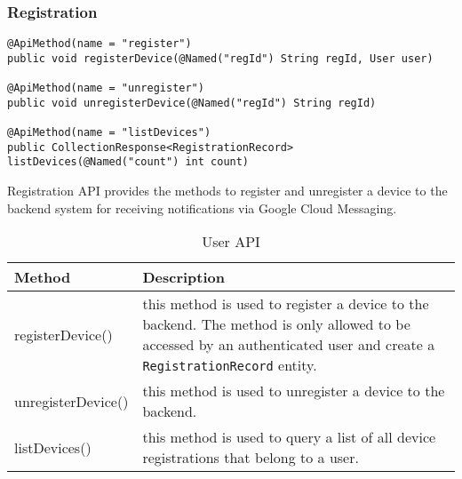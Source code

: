 \subsubsection{Registration}
\begin{minipage}{\linewidth}
\begin{lstlisting}
@ApiMethod(name = "register")
public void registerDevice(@Named("regId") String regId, User user)

@ApiMethod(name = "unregister")
public void unregisterDevice(@Named("regId") String regId)

@ApiMethod(name = "listDevices")
public CollectionResponse<RegistrationRecord> listDevices(@Named("count") int count)
\end{lstlisting}
\end{minipage}

Registration API provides the methods to register and unregister a device to the backend system for receiving
notifications via Google Cloud Messaging.

\begin{table}[h]
\begin{center}
    \begin{tabular}{| l | p{12cm} |}
        \hline Method & Description \\
        \hline registerDevice() & 
            this method is used to register a device to the backend. The method is only allowed to be accessed by an
            authenticated user and create a \texttt{RegistrationRecord} entity. \\
        \hline unregisterDevice() &
            this method is used to unregister a device to the backend.\\
        \hline listDevices() &
            this method is used to query a list of all device registrations that belong to a user. \\
        \hline
    \end{tabular}
    \caption{User API}
\end{center}
\end{table}

